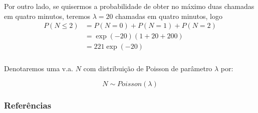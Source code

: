 \documentclass[14pt,aspectratio=1610]{beamer}
\begin{document}
\begin{frame}{}
\frametitle{}
\begin{block}{}
\justifying
Por outro lado, se quisermos a probabilidade de obter no máximo duas chamadas
em quatro minutos, teremos $\lambda=20$ chamadas em quatro minutos, logo
\begin{align*}
P(N\leq 2)&=P(N=0)+P(N=1)+P(N=2)\\
&=\exp{(-20)}(1+20+200)\\
&=221\exp{(-20)}
\end{align*}

\end{block}
\end{frame}

\begin{frame}{}
\frametitle{}
\begin{block}{}
\justifying
Denotaremos uma v.a. $N$ com distribuição de Poisson de parâmetro $\lambda$ por:

$$N\sim Poisson(\lambda)$$
\end{block}
\nocite{Apostila}
\end{frame}

\begin{frame}%
\frametitle{\bf Referências}

\end{frame}
\end{document}
